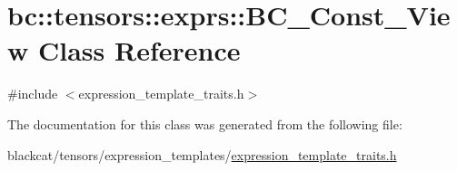 \hypertarget{classbc_1_1tensors_1_1exprs_1_1BC__Const__View}{}\section{bc\+:\+:tensors\+:\+:exprs\+:\+:B\+C\+\_\+\+Const\+\_\+\+View Class Reference}
\label{classbc_1_1tensors_1_1exprs_1_1BC__Const__View}


{\ttfamily \#include $<$expression\+\_\+template\+\_\+traits.\+h$>$}



The documentation for this class was generated from the following file\+:\begin{DoxyCompactItemize}
\item 
blackcat/tensors/expression\+\_\+templates/\hyperlink{expression__template__traits_8h}{expression\+\_\+template\+\_\+traits.\+h}\end{DoxyCompactItemize}
